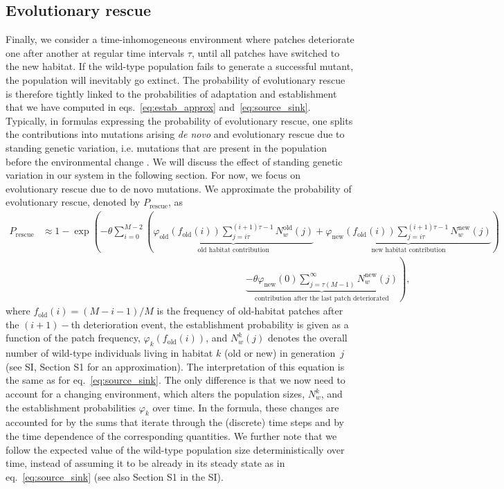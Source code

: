 \documentclass[a4paper,11pt]{article}
\newcommand{\chg}[1]{\textcolor{change}{#1}}
\begin{document}
\subsection*{Evolutionary rescue}
Finally, we consider a time-inhomogeneous environment where patches deteriorate one after \chg{another} at regular time intervals $\tau$, until all patches have switched to the new habitat. If the wild-type population fails to generate a successful mutant, the population will \chg{inevitably} go extinct. The probability of evolutionary rescue is therefore tightly linked to the probabilities of adaptation and establishment that we have computed in eqs.~\eqref{eq:estab_approx} and~\eqref{eq:source_sink}. Typically, in formulas expressing the probability of evolutionary rescue, one splits the contributions into mutations arising \textit{de novo} and evolutionary rescue due to standing genetic variation, i.e. mutations that are present in the population before the environmental change \citep{alexander_2014}. We will discuss the effect of standing genetic variation in our system in the following section. For now, we focus on evolutionary rescue due to de novo mutations. We approximate the probability of evolutionary rescue, denoted by $P_{\text{rescue}}$, as
\begin{equation}\label{eq:evol_rescue}
    \begin{aligned}
		P_{\text{rescue}} &\approx 1-\exp\left(- \theta \sum_{i=0}^{M-2} \left(\underbrace{\varphi_{\text{old}}\left(f_{\text{old}}(i)\right) \sum_{j=i\tau}^{(i+1)\tau -1} N_w^{\text{old}}(j)}_{\text{old habitat contribution}} + \underbrace{\varphi_{\text{new}}(f_{\text{old}}(i)) \sum_{j=i\tau}^{(i+1)\tau -1} N_w^{\text{new}}(j)}_{\text{new habitat contribution}}\right)\right.\\
		&\qquad\qquad \qquad\qquad\qquad\qquad\qquad \qquad \qquad \qquad\quad  \left.\underbrace{-\theta \varphi_{\text{new}}(0) \sum_{j = \tau (M-1) }^\infty  N_w^{\text{new}}(j)}_{\text{contribution after the last patch deteriorated}}\right),
	\end{aligned}
\end{equation}
where $f_{\text{old}}(i) = (M-i-1)/M$ is the frequency of old-habitat patches after the $(i+1)-$th deterioration event\chg{, the establishment probability is given as a function of the patch frequency, $\varphi_k(f_{\text{old}}(i))$,} and $N_w^{k}(j)$ denotes the overall number of wild-type individuals living in habitat $k$ (old or new) in generation~$j$ \chg{(see SI, Section S1 for an approximation)}. The interpretation of this equation is the same as for eq.~\eqref{eq:source_sink}. The only difference is that we now need to account for a changing environment, which alters the population sizes, $N_w^k$, and the establishment probabilities $\varphi_k$ \chg{over time}. In the formula, these changes are accounted for by the sums that iterate through the (discrete) time steps and by the time dependence of the corresponding quantities. We further note that we follow the \chg{expected value of} the wild-type population size deterministically over time, instead of assuming it to be already in its steady state as in eq.~\eqref{eq:source_sink} \chg{(see also Section S1 in the SI)}.
\end{document}
